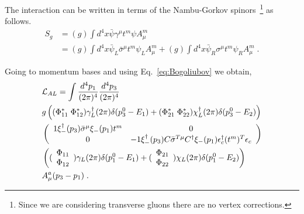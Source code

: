 \documentclass[10pt, aps, prd, superscriptaddress, nofootinbib, 
               amsmath, amssymb, twocolumn,
               preprintnumbers, showpacs,
               raggedbottom,
               floatfix]{revtex4-1}
\newcommand{\calL}{{\cal{L}}}
\newcommand{\bsigma}{{\bar{\sigma}}}
\begin{document}
The interaction can be written in terms of the Nambu-Gorkov
spinors~\footnote{Since we are considering transverse gluons there are no
vertex corrections.} as follows.
\begin{equation}
\begin{split}
S_{g} &= (g)\int d^4 x \bar{\psi}\gamma^\mu t^m\psi A_\mu^m\\
&=(g)\int d^4 x \bar{\psi}_L\bar{\sigma}^\mu t^m\psi_L A_\mu^m
+(g)\int d^4 x \bar{\psi}_R{\sigma}^\mu t^m\psi_R A_\mu^m\;.
\end{split}
\end{equation}

Going to momentum bases and using Eq.~\ref{eq:Bogoliubov} we obtain,
\begin{equation}
\begin{split}
&\calL_{AL}=\int \frac{d^4p_1}{(2\pi)^4} \frac{d^4p_3}{(2\pi)^4} \\
&
{g}\left(
  (\Phi^*_{11}\;\Phi^*_{12})\gamma_L^\dagger(2\pi)\delta(p_3^0-E_1)+
  (\Phi^*_{21}\;\Phi^*_{22})\chi_L^\dagger(2\pi)\delta(p_3^0-E_2)\right)  \\
  &
   \left(\begin{array}{cc}
   1\xi_{-}^\dagger(p_3)\bsigma^\mu \xi_{-}(p_1)t^m & 0\\
   0 & -1\xi_{-}^\dagger(p_3)C \bsigma^{T\mu} C^\dagger \xi_{-}(p_1)\epsilon_{c}^\dagger(t^m)^T \epsilon_c\\
  \end{array}
  \right)\\
&\left((\begin{array}{c}\Phi_{11}\\ \Phi_{12}\end{array})\gamma_L(2\pi)\delta(p_1^0-E_1)
      +(\begin{array}{c}\Phi_{21}\\ \Phi_{22}\end{array})\chi_L(2\pi)\delta(p_1^0-E_2)
      \right)\\
&      
A^a_{\mu}(p_3-p_1)\;.
\end{split}
\end{equation}
\end{document}
